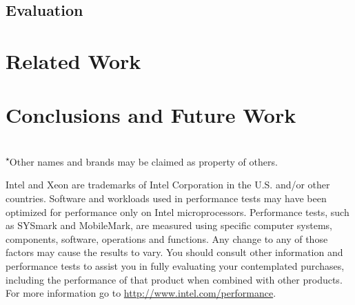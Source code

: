 \documentclass{llncs}
\newcommand{\othertm}{\textsuperscript{$\star$}}
\begin{document}
\subsection{Evaluation}
\label{sec:results}
 
%

%

%

\section{Related Work}
\label{sec:related}

\section{Conclusions and Future Work}
\label{sec:conclusion}


\scriptsize{
    ~\\
    \noindent\othertm{}Other names and brands may be claimed as property of others.

    \noindent
    Intel and Xeon are trademarks of Intel Corporation in the U.S. and/or other countries.
    Software and workloads used in performance tests may have been optimized
    for performance only on Intel microprocessors.  Performance tests, such as
    SYSmark and MobileMark, are measured using specific computer systems,
    components, software, operations and functions.  Any change to any of those
    factors may cause the results to vary.  You should consult other information
    and performance tests to assist you in fully evaluating your contemplated
    purchases, including the performance of that product when combined with
    other products.  For more information go to \url{http://www.intel.com/performance}.
}

\small{


}
\end{document}
